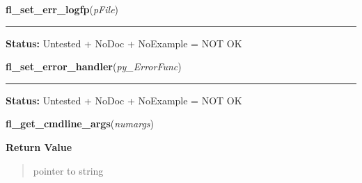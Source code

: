     \label{xformslib:library:fl_set_err_logfp}

    \vspace{0.5ex}

\hspace{.8\funcindent}\begin{boxedminipage}{\funcwidth}

    \raggedright \textbf{fl\_set\_err\_logfp}(\textit{pFile})

    \vspace{-1.5ex}

    \rule{\textwidth}{0.5\fboxrule}
\setlength{\parskip}{2ex}
\setlength{\parskip}{1ex}
\textbf{Status:} Untested + NoDoc + NoExample = NOT OK



    \end{boxedminipage}

    \label{xformslib:library:fl_set_error_handler}

    \vspace{0.5ex}

\hspace{.8\funcindent}\begin{boxedminipage}{\funcwidth}

    \raggedright \textbf{fl\_set\_error\_handler}(\textit{py\_ErrorFunc})

    \vspace{-1.5ex}

    \rule{\textwidth}{0.5\fboxrule}
\setlength{\parskip}{2ex}
\setlength{\parskip}{1ex}
\textbf{Status:} Untested + NoDoc + NoExample = NOT OK



    \end{boxedminipage}

    \label{xformslib:library:fl_get_cmdline_args}

    \vspace{0.5ex}

\hspace{.8\funcindent}\begin{boxedminipage}{\funcwidth}

    \raggedright \textbf{fl\_get\_cmdline\_args}(\textit{numargs})

\setlength{\parskip}{2ex}
\setlength{\parskip}{1ex}
      \textbf{Return Value}
    \vspace{-1ex}

      \begin{quote}
      pointer to string

      \end{quote}

    \end{boxedminipage}

